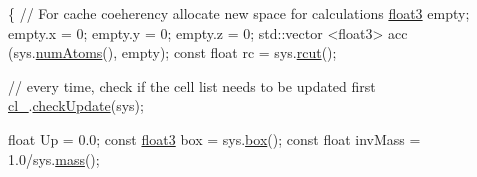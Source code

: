 \begin{DoxyCode}
                                                 \{
    \textcolor{comment}{// For cache coeherency allocate new space for calculations}
    \hyperlink{structfloat3}{float3} empty;
    empty.x = 0; empty.y = 0; empty.z = 0;
    std::vector <float3> acc (sys.\hyperlink{classsystem_definition_ae8d3c2df2d56241cee03fcc4e2026ae0}{numAtoms}(), empty);
    \textcolor{keyword}{const} \textcolor{keywordtype}{float} rc = sys.\hyperlink{classsystem_definition_acacd88aac7d451bdcf9779ae8c5a95c7}{rcut}();

    \textcolor{comment}{// every time, check if the cell list needs to be updated first}
    \hyperlink{classintegrator_ad1f7813c9cf3c31898aa7d78fc22232a}{cl\_}.\hyperlink{classcell_list__cpu_a70568e6a2012eb8592f2798b3260c550}{checkUpdate}(sys);

    \textcolor{keywordtype}{float} Up = 0.0;
    \textcolor{keyword}{const} \hyperlink{structfloat3}{float3} box = sys.\hyperlink{classsystem_definition_a85b80dee3609ddb68e370cee3fa959ea}{box}();
    \textcolor{keyword}{const} \textcolor{keywordtype}{float} invMass = 1.0/sys.\hyperlink{classsystem_definition_acb6dd3df121e3e5bc0eb41c32bd937bd}{mass}();
    

\end{DoxyCode}
